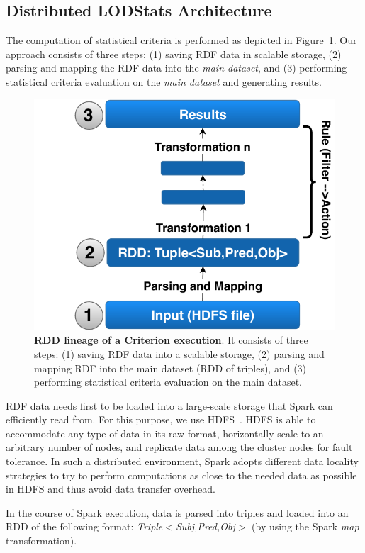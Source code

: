 \subsection{Distributed LODStats Architecture}
The computation of statistical criteria is performed as depicted in Figure~\ref{fig:RDD_Lineage}.
Our approach consists of three steps: (1) saving \gls{RDF} data in scalable storage, (2) parsing and mapping the \gls{RDF} data into the \emph{main dataset}, and (3) performing statistical criteria evaluation on the \emph{main dataset} and generating results.

\begin{figure}
\centering
\includegraphics[width=.45\columnwidth]{images/4_distlodstats/distlodstats-rdd-lineage.pdf}
\caption{\textbf{RDD lineage of a Criterion execution}. 
It consists of three steps: (1) saving RDF data into a scalable storage, (2) parsing and mapping RDF into the main dataset (RDD of triples), and (3) performing statistical criteria evaluation on the main dataset.}
\label{fig:RDD_Lineage}
\end{figure}

 \gls{RDF} data needs first to be loaded into a large-scale storage that Spark can efficiently read from.
For this purpose, we use \gls{HDFS}~.
\gls{HDFS} is able to accommodate any type of data in its raw format, horizontally scale to an arbitrary number of nodes, and replicate data among the cluster nodes for fault tolerance.
In such a distributed environment, Spark adopts different data locality strategies to try to perform computations as close to the needed data as possible in \gls{HDFS} and thus avoid data transfer overhead.
 
 In the course of Spark execution, data is parsed into triples and loaded into an \gls{RDD} of the following format: \emph{Triple$<$Subj,Pred,Obj$>$} (by using the Spark \textit{map} transformation).

